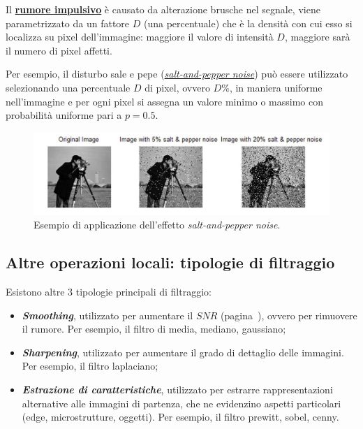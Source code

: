 \documentclass[a4paper]{article}
\begin{document}
	Il \textcolor{Red3}{\textbf{\underline{rumore impulsivo}}} è causato da alterazione brusche nel segnale, viene parametrizzato da un fattore $D$ (una percentuale) che è la densità con cui esso si localizza su pixel dell'immagine: maggiore il valore di intensità $D$, maggiore sarà il numero di pixel affetti.\newline
	
	\noindent
	Per esempio, il disturbo sale e pepe (\href{https://it.wikipedia.org/wiki/Rumore_sale_e_pepe}{\emph{salt-and-pepper noise}}) può essere utilizzato selezionando una percentuale $D$ di pixel, ovvero $D\%$, in maniera uniforme nell'immagine e per ogni pixel si assegna un valore minimo o massimo con probabilità uniforme pari a $p = 0.5$.
	
	\begin{figure}[!htp]
		\centering
		\includegraphics[width=\textwidth]{img/rumore_impulsivo.png}
		\caption{Esempio di applicazione dell'effetto \emph{salt-and-pepper noise}.}
	\end{figure}

	\newpage
	
	\subsection{Altre operazioni locali: tipologie di filtraggio}
	
	Esistono altre $3$ tipologie principali di filtraggio:
	
	\begin{itemize}
		\item \textcolor{Red3}{\textbf{\emph{Smoothing}}}, utilizzato per aumentare il $SNR$ (pagina~\pageref{SNR}), ovvero per rimuovere il rumore.\newline
		Per esempio, il filtro di media, mediano, gaussiano;

		\item \textcolor{Red3}{\textbf{\emph{Sharpening}}}, utilizzato per aumentare il grado di dettaglio delle immagini.\newline
		Per esempio, il filtro laplaciano;

		\item \textcolor{Red3}{\textbf{\emph{Estrazione di caratteristiche}}}, utilizzato per estrarre rappresentazioni alternative alle immagini di partenza, che ne evidenzino aspetti particolari (edge, microstrutture, oggetti).\newline
		Per esempio, il filtro prewitt, sobel, cenny.
	\end{itemize}
\end{document}
